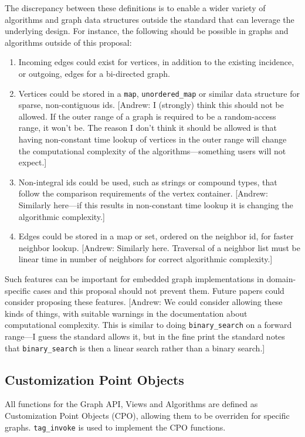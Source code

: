 \documentclass[10pt,onecolumn]{article}
\newcommand{\tcode}[1]{\lstinline{#1}}
\newcommand{\comment}[2]{[{\sc #1:} \textsf{#2}]}
\newcommand{\andrew}[1]{\comment{Andrew}{#1}}
\begin{document}
The discrepancy between these definitions is to enable a wider variety of algorithms and graph data structures outside the standard that 
can leverage the underlying design. For instance, the following should be possible in graphs and algorithms outside of this proposal:

\begin{enumerate}
\item Incoming edges could exist for vertices, in addition to the existing incidence, or outgoing, edges for a bi-directed graph.
\item Vertices could be stored in a \tcode{map}, \tcode{unordered_map} or similar data structure for sparse, non-contiguous ids.
\andrew{I (strongly) think this should not be allowed.  If the outer range of a graph is required to be a random-access range, it won't be.  The reason I don't think it should be allowed is that having non-constant time lookup of vertices in the outer range will change the computational complexity of the algorithms---something users will not expect.}
\item Non-integral ids could be used, such as strings or compound types, that follow the comparison requirements of the vertex container.  \andrew{Similarly here---if this results in non-constant time lookup it is changing the algorithmic complexity.}
\item Edges could be stored in a map or set, ordered on the neighbor id, for faster neighbor lookup.
  \andrew{Similarly here.  Traversal of a neighbor list must be linear time in number of neighbors for correct algorithmic complexity.}
\end{enumerate}

Such features can be important for embedded graph implementations in domain-specific cases and this proposal should not prevent them. 
Future papers could consider proposing these features.
\andrew{We could consider allowing these kinds of things, with suitable warnings in the documentation about computational complexity.  This is similar to doing \tcode{binary_search} on a forward range---I guess the standard allows it, but in the fine print the standard notes that \tcode{binary_search} is then a linear search rather than a binary search.}

\subsection{Customization Point Objects}
All functions for the Graph API, Views and Algorithms are defined as Customization Point Objects (CPO), allowing them to be overriden for
specific graphs. \tcode{tag_invoke} is used to implement the CPO functions.
\end{document}
